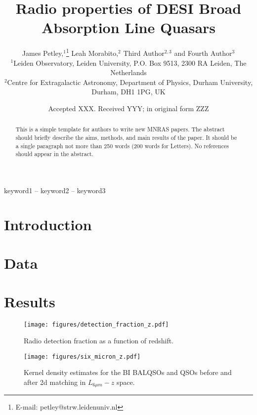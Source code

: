 \documentclass[fleqn,usenatbib]{mnras}
\title[DESI Radio BALQSOs]{Radio properties of DESI Broad Absorption Line Quasars}
\author[Petley et al.]{
James Petley,$^{1}$\thanks{E-mail: petley@strw.leidenuniv.nl}
Leah Morabito,$^{2}$
Third Author$^{2,3}$
and Fourth Author$^{3}$
\\
$^{1}$Leiden Observatory, Leiden University, P.O. Box 9513, 2300 RA Leiden, The Netherlands\\
$^{2}$Centre for Extragalactic Astronomy, Department of Physics, Durham University, Durham, DH1 1PG, UK\\
}
\date{Accepted XXX. Received YYY; in original form ZZZ}
\begin{document}
\maketitle

\begin{abstract}
This is a simple template for authors to write new MNRAS papers.
The abstract should briefly describe the aims, methods, and main results of the paper.
It should be a single paragraph not more than 250 words (200 words for Letters).
No references should appear in the abstract.
\end{abstract}

\begin{keywords}
keyword1 -- keyword2 -- keyword3
\end{keywords}



\section{Introduction}

\section{Data}

\section{Results}

\begin{figure}
    \centering
    \texttt{[image: figures/detection\_fraction\_z.pdf]}
    \caption{Radio detection fraction as a function of redshift.}
    \label{fig:detection_fraction}
\end{figure}

\begin{figure}
    \centering
    \texttt{[image: figures/six\_micron\_z.pdf]}
    \caption{Kernel density estimates for the BI BALQSOs and QSOs before and after 2d matching in $L_{6\mu m} - z $ space.}
    \label{fig:matching}
\end{figure}
\end{document}
